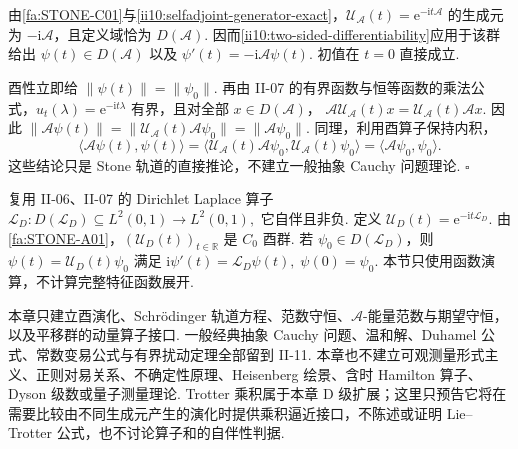 \begin{FAProof}
由\autoref{fa:STONE-C01}与\autoref{ii10:selfadjoint-generator-exact}，\(\displaystyle\mathcal U_{\mathcal A}(t)=\mathrm{e}^{-\mathrm{i}t\mathcal A}\) 的生成元为 \(\displaystyle-\mathrm{i}\mathcal A\)，且定义域恰为 \(\displaystyle D(\mathcal A)\). 因而\autoref{ii10:two-sided-differentiability}应用于该群给出 \(\displaystyle\psi(t)\in D(\mathcal A)\) 以及 \(\displaystyle \psi'(t)=-\mathrm{i}\mathcal A\psi(t).\)
初值在 \(\displaystyle t=0\) 直接成立.

酉性立即给 \(\displaystyle\|\psi(t)\|=\|\psi_0\|\). 再由 II-07 的有界函数与恒等函数的乘法公式，\(\displaystyle u_t(\lambda)=\mathrm{e}^{-\mathrm{i}t\lambda}\) 有界，且对全部 \(\displaystyle x\in D(\mathcal A)\)， \(\displaystyle \mathcal A\mathcal U_{\mathcal A}(t)x = \mathcal U_{\mathcal A}(t)\mathcal Ax.\)
因此 \(\displaystyle \|\mathcal A\psi(t)\| = \|\mathcal U_{\mathcal A}(t)\mathcal A\psi_0\| = \|\mathcal A\psi_0\|.\)
同理，利用酉算子保持内积，
\[
\langle\mathcal A\psi(t),\psi(t)\rangle
=
\langle\mathcal U_{\mathcal A}(t)\mathcal A\psi_0,\mathcal U_{\mathcal A}(t)\psi_0\rangle
=
\langle\mathcal A\psi_0,\psi_0\rangle.
\]
这些结论只是 Stone 轨道的直接推论，不建立一般抽象 Cauchy 问题理论.
\hfill\(\square\)
\end{FAProof}

\begin{FAApplication}
复用 II-06、II-07 的 Dirichlet Laplace 算子 \(\displaystyle \mathcal L_D:D(\mathcal L_D)\subseteq L^2(0,1)\to L^2(0,1),\)
它自伴且非负. 定义 \(\displaystyle \mathcal U_D(t)=\mathrm{e}^{-\mathrm{i}t\mathcal L_D}.\)
由\autoref{fa:STONE-A01}，\(\displaystyle(\mathcal U_D(t))_{t\in\mathbb R}\) 是 \(\displaystyle C_0\) 酉群. 若 \(\displaystyle\psi_0\in D(\mathcal L_D)\)，则 \(\displaystyle \psi(t)=\mathcal U_D(t)\psi_0\)
满足 \(\displaystyle \mathrm{i}\psi'(t)=\mathcal L_D\psi(t), \; \psi(0)=\psi_0.\)
本节只使用函数演算，不计算完整特征函数展开.
\end{FAApplication}

\begin{FAWarning}
本章只建立酉演化、Schrödinger 轨道方程、范数守恒、\(\displaystyle\mathcal A\)-能量范数与期望守恒，以及平移群的动量算子接口. 一般经典抽象 Cauchy 问题、温和解、Duhamel 公式、常数变易公式与有界扰动定理全部留到 II-11. 本章也不建立可观测量形式主义、正则对易关系、不确定性原理、Heisenberg 绘景、含时 Hamilton 算子、Dyson 级数或量子测量理论. Trotter 乘积属于本章 D 级扩展；这里只预告它将在需要比较由不同生成元产生的演化时提供乘积逼近接口，不陈述或证明 Lie--Trotter 公式，也不讨论算子和的自伴性判据.
\end{FAWarning}

